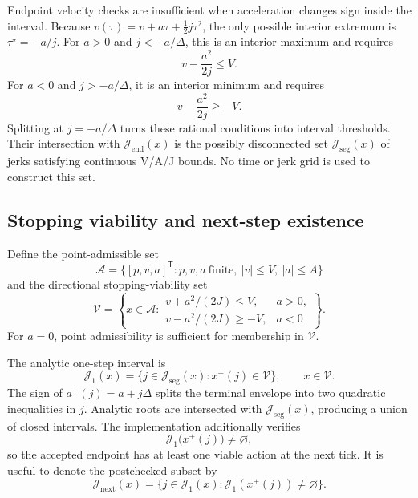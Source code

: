 Endpoint velocity checks are insufficient when acceleration changes sign
inside the interval.  Because
\(v(\tau)=v+a\tau+\tfrac12j\tau^2\), the only possible interior extremum is
\(\tau^\star=-a/j\).  For \(a>0\) and \(j<-a/\Delta\), this is an interior
maximum and requires
\begin{equation}
  v-\frac{a^2}{2j}\leq V.
  \label{eq:positive-acceleration-extremum}
\end{equation}
For \(a<0\) and \(j>-a/\Delta\), it is an interior minimum and requires
\begin{equation}
  v-\frac{a^2}{2j}\geq -V.
  \label{eq:negative-acceleration-extremum}
\end{equation}
Splitting at \(j=-a/\Delta\) turns these rational conditions into interval
thresholds.  Their intersection with
\(\mathcal J_{\mathrm{end}}(x)\) is the possibly disconnected set
\(\mathcal J_{\mathrm{seg}}(x)\) of jerks satisfying continuous V/A/J bounds.
No time or jerk grid is used to construct this set.

\subsection{Stopping viability and next-step existence}

Define the point-admissible set
\begin{equation}
  \mathcal A =
  \{[p,v,a]^{\mathsf T}:
  p,v,a\ \text{finite},\ |v|\leq V,\ |a|\leq A\}
  \label{eq:point-admissible-set}
\end{equation}
and the directional stopping-viability set
\begin{equation}
  \mathcal V =
  \left\{x\in\mathcal A:
  \begin{array}{ll}
    v+a^2/(2J)\leq V,&a>0,\\
    v-a^2/(2J)\geq -V,&a<0
  \end{array}
  \right\}.
  \label{eq:viability-set}
\end{equation}
For \(a=0\), point admissibility is sufficient for membership in
\(\mathcal V\).

The analytic one-step interval is
\begin{equation}
  \mathcal J_1(x)=
  \{j\in\mathcal J_{\mathrm{seg}}(x):x^+(j)\in\mathcal V\},
  \qquad x\in\mathcal V.
  \label{eq:one-step-viable-jerks}
\end{equation}
The sign of \(a^+(j)=a+j\Delta\) splits the terminal envelope into two
quadratic inequalities in \(j\).  Analytic roots are intersected with
\(\mathcal J_{\mathrm{seg}}(x)\), producing a union of closed intervals.
The implementation additionally verifies
\begin{equation}
  \mathcal J_1\bigl(x^+(j)\bigr)\neq\varnothing,
  \label{eq:next-step-existence}
\end{equation}
so the accepted endpoint has at least one viable action at the next tick.  It
is useful to denote the postchecked subset by
\begin{equation}
  \mathcal J_{\mathrm{next}}(x)=
  \{j\in\mathcal J_1(x):
  \mathcal J_1(x^+(j))\neq\varnothing\}.
  \label{eq:next-preserving-jerks}
\end{equation}

